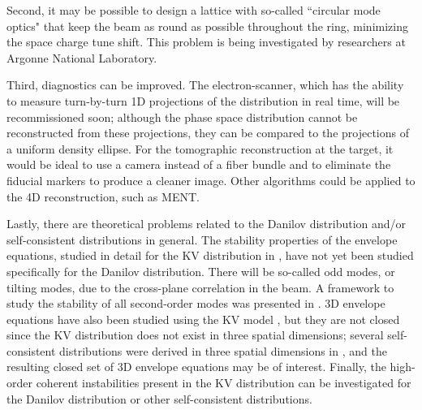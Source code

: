 Second, it may be possible to design a lattice with so-called ``circular mode optics" that keep the beam as round as possible throughout the ring, minimizing the space charge tune shift. This problem is being investigated by researchers at Argonne National Laboratory. 

Third, diagnostics can be improved. The electron-scanner, which has the ability to measure turn-by-turn 1D projections of the distribution in real time, will be recommissioned soon; although the phase space distribution cannot be reconstructed from these projections, they can be compared to the projections of a uniform density ellipse. For the tomographic reconstruction at the target, it would be ideal to use a camera instead of a fiber bundle and to eliminate the fiducial markers to produce a cleaner image. Other algorithms could be applied to the 4D reconstruction, such as MENT.

Lastly, there are theoretical problems related to the Danilov distribution and/or self-consistent distributions in general. The stability properties of the envelope equations, studied in detail for the KV distribution in \cite{Lund2004}, have not yet been studied specifically for the Danilov distribution. There will be so-called odd modes, or tilting modes, due to the cross-plane correlation in the beam. A framework to study the stability of all second-order modes was presented in \cite{Yuan2017}. 3D envelope equations have also been studied using the KV model \cite{Qiang2018}, but they are not closed since the KV distribution does not exist in three spatial dimensions; several self-consistent distributions were derived in three spatial dimensions in \cite{Danilov2003}, and the resulting closed set of 3D envelope equations may be of interest. Finally, the high-order coherent instabilities present in the KV distribution can be investigated for the Danilov distribution or other self-consistent distributions.